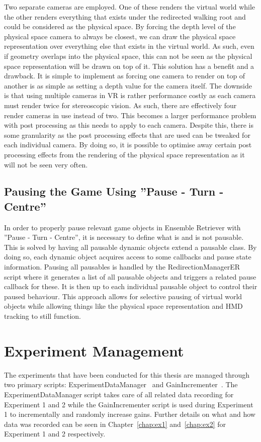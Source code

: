 Two separate cameras are employed. One of these renders the virtual world while the other renders everything that exists under the redirected walking root and could be considered as the physical space. By forcing the depth level of the physical space camera to always be closest, we can draw the physical space representation over everything else that exists in the virtual world. As such, even if geometry overlaps into the physical space, this can not be seen as the physical space representation will be drawn on top of it. This solution has a benefit and a drawback. It is simple to implement as forcing one camera to render on top of another is as simple as setting a depth value for the camera itself. The downside is that using multiple cameras in VR is rather performance costly as each camera must render twice for stereoscopic vision. As such, there are effectively four render cameras in use instead of two. This becomes a larger performance problem with post processing as this needs to apply to each camera. Despite this, there is some granularity as the post processing effects that are used can be tweaked for each individual camera. By doing so, it is possible to optimise away certain post processing effects from the rendering of the physical space representation as it will not be seen very often. 

\subsection{Pausing the Game Using ''Pause - Turn - Centre''}
In order to properly pause relevant game objects in Ensemble Retriever with ''Pause - Turn - Centre'', it is necessary to define what is and is not pausable. This is solved by having all pausable dynamic objects extend a pausable class. By doing so, each dynamic object acquires access to some callbacks and pause state information. Pausing all pausables is handled by the RedirectionManagerER script where it generates a list of all pausable objects and triggers a related pause callback for these. It is then up to each individual pausable object to control their paused behaviour. This approach allows for selective pausing of virtual world objects while allowing things like the physical space representation and HMD tracking to still function. 
 
\section{Experiment Management}
The experiments that have been conducted for this thesis are managed through two primary scripts: ExperimentDataManager~\cite{experimentDataManager} and GainIncrementer~\cite{gainIncrementer}. The ExperimentDataManager script takes care of all related data recording for Experiment 1 and 2 while the GainIncrementer script is used during Experiment 1 to incrementally and randomly increase gains. Further details on what and how data was recorded can be seen in Chapter~\ref{chap:ex1} and~\ref{chap:ex2} for Experiment 1 and 2 respectively. 

